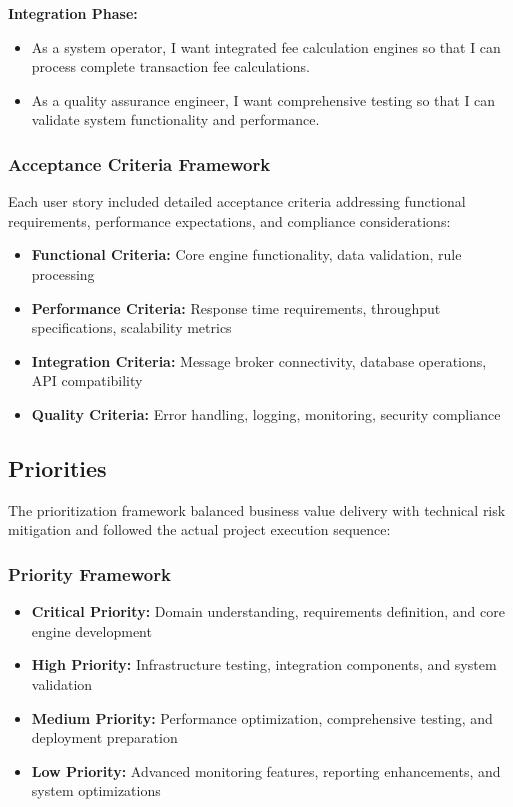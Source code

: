 \textbf{Integration Phase:}
\begin{itemize}
    \item As a system operator, I want integrated fee calculation engines so that I can process complete transaction fee calculations.
    \item As a quality assurance engineer, I want comprehensive testing so that I can validate system functionality and performance.
\end{itemize}

\subsubsection{Acceptance Criteria Framework}

Each user story included detailed acceptance criteria addressing functional requirements, performance expectations, and compliance considerations:

\begin{itemize}
    \item \textbf{Functional Criteria:} Core engine functionality, data validation, rule processing
    \item \textbf{Performance Criteria:} Response time requirements, throughput specifications, scalability metrics
    \item \textbf{Integration Criteria:} Message broker connectivity, database operations, API compatibility
    \item \textbf{Quality Criteria:} Error handling, logging, monitoring, security compliance
\end{itemize}

\subsection{Priorities}

The prioritization framework balanced business value delivery with technical risk mitigation and followed the actual project execution sequence:

\subsubsection{Priority Framework}

\begin{itemize}
    \item \textbf{Critical Priority:} Domain understanding, requirements definition, and core engine development
    \item \textbf{High Priority:} Infrastructure testing, integration components, and system validation
    \item \textbf{Medium Priority:} Performance optimization, comprehensive testing, and deployment preparation
    \item \textbf{Low Priority:} Advanced monitoring features, reporting enhancements, and system optimizations
\end{itemize}

